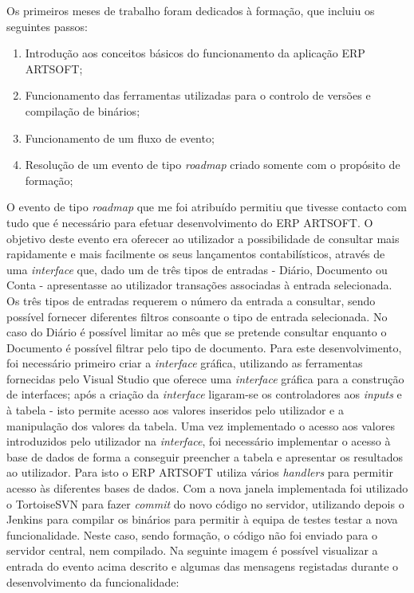 \documentclass[sigplan]{acmart}
\begin{document}
Os primeiros meses de trabalho foram dedicados à formação, que incluiu os seguintes passos:
\begin{enumerate}
  \item Introdução aos conceitos básicos do funcionamento da aplicação ERP ARTSOFT;
  \item Funcionamento das ferramentas utilizadas para o controlo de versões e compilação de binários;
  \item Funcionamento de um fluxo de evento;
  \item Resolução de um evento de tipo \textit{roadmap} criado somente com o propósito de formação;
\end{enumerate}
O evento de tipo \textit{roadmap} que me foi atribuído permitiu que tivesse contacto com tudo que é necessário para efetuar desenvolvimento do ERP ARTSOFT. O objetivo deste evento era oferecer ao utilizador a possibilidade de consultar mais rapidamente e mais facilmente os seus lançamentos contabilísticos, através de uma \textit{interface} que, dado um de três tipos de entradas - Diário, Documento ou Conta - apresentasse ao utilizador transações associadas à entrada selecionada. Os três tipos de entradas requerem o número da entrada a consultar, sendo possível fornecer diferentes filtros consoante o tipo de entrada selecionada. No caso do Diário é possível limitar ao mês que se pretende consultar enquanto o Documento é possível filtrar pelo tipo de documento. Para este desenvolvimento, foi necessário primeiro criar a \textit{interface} gráfica, utilizando as ferramentas fornecidas pelo Visual Studio que oferece uma \textit{interface} gráfica para a construção de interfaces; após a criação da \textit{interface} ligaram-se os controladores aos \textit{inputs} e à tabela - isto permite acesso aos valores inseridos pelo utilizador e a manipulação dos valores da tabela. Uma vez implementado o acesso aos valores introduzidos pelo utilizador na \textit{interface}, foi necessário implementar o acesso à base de dados de forma a conseguir preencher a tabela e apresentar os resultados ao utilizador. Para isto o ERP ARTSOFT utiliza vários \textit{handlers} para permitir acesso às diferentes bases de dados. Com a nova janela implementada foi utilizado o TortoiseSVN para fazer \textit{commit} do novo código no servidor, utilizando depois o Jenkins para compilar os binários para permitir à equipa de testes testar a nova funcionalidade. Neste caso, sendo formação, o código não foi enviado para o servidor central, nem compilado. Na seguinte imagem é possível visualizar a entrada do evento acima descrito e algumas das mensagens registadas durante o desenvolvimento da funcionalidade:
\end{document}
